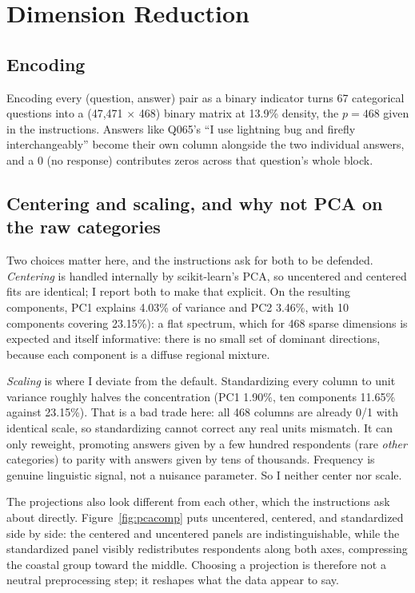 \documentclass[10pt,letterpaper]{article}
\begin{document}
\section{Dimension Reduction}\label{dimension-reduction}

\subsection{Encoding}

Encoding every (question, answer) pair as a binary indicator turns 67
categorical questions into a (47,471 $\times$ 468) binary matrix at 13.9\%
density, the $p = 468$ given in the instructions. Answers like Q065's
``I use lightning bug and firefly interchangeably'' become their own column
alongside the two individual answers, and a 0 (no response) contributes zeros
across that question's whole block.

\subsection{Centering and scaling, and why not PCA on the raw categories}

Two choices matter here, and the instructions ask for both to be defended.
\emph{Centering} is handled internally by scikit-learn's PCA, so uncentered and
centered fits are identical; I report both to make that explicit. On the
resulting components, PC1 explains 4.03\% of variance and PC2 3.46\%, with
10 components covering 23.15\%): a flat spectrum, which for 468 sparse
dimensions is expected and itself informative: there is no small set of
dominant directions, because each component is a diffuse regional mixture.

\emph{Scaling} is where I deviate from the default. Standardizing every column
to unit variance roughly halves the concentration (PC1 1.90\%, ten components
11.65\% against 23.15\%). That is a bad trade here: all 468 columns are already
0/1 with identical scale, so standardizing cannot correct any real units
mismatch. It can only reweight, promoting answers given by a few hundred
respondents (rare \emph{other} categories) to parity with answers given by
tens of thousands. Frequency is genuine linguistic signal, not a nuisance
parameter. So I neither center nor scale.

The projections also look different from each other, which the instructions
ask about directly. Figure~\ref{fig:pcacomp} puts uncentered, centered, and
standardized side by side: the centered and uncentered panels are
indistinguishable, while the standardized panel visibly redistributes
respondents along both axes, compressing the coastal group toward the middle.
Choosing a projection is therefore not a neutral preprocessing step; it
reshapes what the data appear to say.
\end{document}
